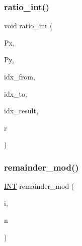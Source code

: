 \mbox{\label{global_8_c_a7e2f01d86f2af1e4557cf2e8775bf064}} 
\subsubsection{\texorpdfstring{ratio\+\_\+int()}{ratio\_int()}}
{\footnotesize\ttfamily void ratio\+\_\+int (\begin{DoxyParamCaption}\item[{\mbox{\hyperlink{galois_8h_a09fddde158a3a20bd2dcadb609de11dc}{I\+NT}} $\ast$}]{Px,  }\item[{\mbox{\hyperlink{galois_8h_a09fddde158a3a20bd2dcadb609de11dc}{I\+NT}} $\ast$}]{Py,  }\item[{\mbox{\hyperlink{galois_8h_a09fddde158a3a20bd2dcadb609de11dc}{I\+NT}}}]{idx\+\_\+from,  }\item[{\mbox{\hyperlink{galois_8h_a09fddde158a3a20bd2dcadb609de11dc}{I\+NT}}}]{idx\+\_\+to,  }\item[{\mbox{\hyperlink{galois_8h_a09fddde158a3a20bd2dcadb609de11dc}{I\+NT}}}]{idx\+\_\+result,  }\item[{double}]{r }\end{DoxyParamCaption})}

\mbox{\label{global_8_c_ac52aeebf4f6b8dcb49f1d85f70f00e7d}} 
\subsubsection{\texorpdfstring{remainder\+\_\+mod()}{remainder\_mod()}}
{\footnotesize\ttfamily \mbox{\hyperlink{galois_8h_a09fddde158a3a20bd2dcadb609de11dc}{I\+NT}} remainder\+\_\+mod (\begin{DoxyParamCaption}\item[{\mbox{\hyperlink{galois_8h_a09fddde158a3a20bd2dcadb609de11dc}{I\+NT}}}]{i,  }\item[{\mbox{\hyperlink{galois_8h_a09fddde158a3a20bd2dcadb609de11dc}{I\+NT}}}]{n }\end{DoxyParamCaption})}

\mbox{\label{global_8_c_a345c446e2e34a78955592030508a3bdb}} 
